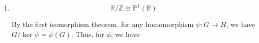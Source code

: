 \documentclass[12 pt, letterpaper]{hmcpset}
\begin{document}
\begin{solution}
\begin{enumerate}
			Further, notice that any $(a : 0), (b : 0) \in \mathbb{P}^{1}(\mathbb{R})$ are actually equal --- since we cannot have $a = 0$ or $b = 0$, we can just write $(a, 0) = a / b(b : 0)$. Thus, its sufficient to have just one $\theta$ with $\phi(\theta) = (a : 0)$. Consider $\theta = 1/2$. Then $\phi(\theta) = (\sin{\pi/2} : \cos{\pi / 2}) = (1 : 0)$. Thus, we also have $(1 : 0) \in \phi(\mathbb{R})$.

			Together with the previous result, we have
			\[
				\mathbb{P}^{1}(\mathbb{R}) = \{ (a_{1} : a_{0}) \mid (a_{1}, a_{0}) \neq (0, 0) \} \subset \phi(\mathbb{R})
			\]
			Since  $\phi(\mathbb{R}) \subseteq \mathbb{P}^{1}(\mathbb{R})$, because $\phi : \mathbb{R} \to \mathbb{P}^{1}(\mathbb{R})$, by double containment we have $\phi(\mathbb{R}) = \mathbb{P}^{1}(\mathbb{R})$.
		\item
			\[
				\boxed{
					\mathbb{R} / \mathbb{Z} \cong \mathbb{P}^{1}(\mathbb{R})
				}
			\]

			By the first isomorphism theorem, for any homomorphism $\psi : G \to H$, we have $G / \ker \psi = \psi(G)$. Thus, for $\phi$, we have 
	\end{enumerate}
\end{solution}
\end{document}
